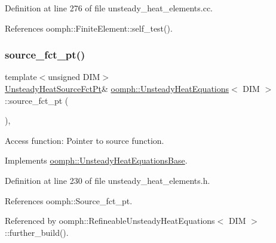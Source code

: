 Definition at line 276 of file unsteady\+\_\+heat\+\_\+elements.\+cc.



References oomph\+::\+Finite\+Element\+::self\+\_\+test().

\mbox{\label{classoomph_1_1UnsteadyHeatEquations_a8bd87b25f079be4dbee6edfc00127d47}} 
\subsubsection{\texorpdfstring{source\+\_\+fct\+\_\+pt()}{source\_fct\_pt()}\hspace{0.1cm}{\footnotesize\ttfamily [1/2]}}
{\footnotesize\ttfamily template$<$unsigned D\+IM$>$ \\
\hyperlink{classoomph_1_1UnsteadyHeatEquations_a967135cc2be2cb4b16fe0dc0b4d68a68}{Unsteady\+Heat\+Source\+Fct\+Pt}\& \hyperlink{classoomph_1_1UnsteadyHeatEquations}{oomph\+::\+Unsteady\+Heat\+Equations}$<$ D\+IM $>$\+::source\+\_\+fct\+\_\+pt (\begin{DoxyParamCaption}{ }\end{DoxyParamCaption})\hspace{0.3cm}{\ttfamily [inline]}, {\ttfamily [virtual]}}



Access function\+: Pointer to source function. 



Implements \hyperlink{classoomph_1_1UnsteadyHeatEquationsBase_a723b841dae0679dcfda13e565dd40f6b}{oomph\+::\+Unsteady\+Heat\+Equations\+Base}.



Definition at line 230 of file unsteady\+\_\+heat\+\_\+elements.\+h.



References oomph\+::\+Source\+\_\+fct\+\_\+pt.



Referenced by oomph\+::\+Refineable\+Unsteady\+Heat\+Equations$<$ D\+I\+M $>$\+::further\+\_\+build().

\mbox{\label{classoomph_1_1UnsteadyHeatEquations_a97883b388b84d415b8954ce9670f73af}} 

